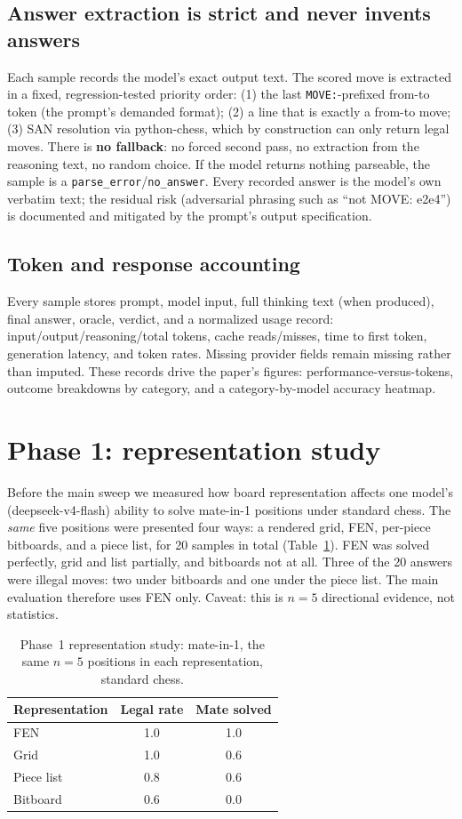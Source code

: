 \documentclass{article}
\begin{document}
\subsection{Answer extraction is strict and never invents answers}
Each sample records the model's exact output text. The scored move is
extracted in a fixed, regression-tested priority order: (1) the last
\texttt{MOVE:}-prefixed from-to token (the prompt's demanded format);
(2) a line that is exactly a from-to move; (3) SAN resolution via
python-chess, which by construction can only return legal moves. There
is \textbf{no fallback}: no forced second pass, no extraction from the
reasoning text, no random choice. If the model returns nothing parseable,
the sample is a \texttt{parse\_error}/\texttt{no\_answer}. Every
recorded answer is the model's own verbatim text; the residual risk
(adversarial phrasing such as ``not MOVE: e2e4'') is documented and
mitigated by the prompt's output specification.

\subsection{Token and response accounting}
Every sample stores prompt, model input, full thinking text (when
produced), final answer, oracle, verdict, and a normalized usage record:
input/output/reasoning/total tokens, cache reads/misses, time to first
token, generation latency, and token rates. Missing provider fields
remain missing rather than imputed. These records drive the paper's
figures: performance-versus-tokens, outcome breakdowns by category, and
a category-by-model accuracy heatmap.

\section{Phase 1: representation study}
\label{sec:phase1}
Before the main sweep we measured how board representation affects one
model's (deepseek-v4-flash) ability to solve mate-in-1 positions under
standard chess. The \emph{same} five positions were presented four ways:
a rendered grid, FEN, per-piece bitboards, and a piece list, for 20
samples in total (Table~\ref{tab:phase1}). FEN was solved perfectly,
grid and list partially, and bitboards not at all. Three of the 20
answers were illegal moves: two under bitboards and one under the piece
list. The main evaluation therefore uses FEN only. Caveat: this is
$n{=}5$ directional evidence, not statistics.

\begin{table}[h]
\centering
\begin{tabular}{lcc}
\hline
Representation & Legal rate & Mate solved \\ \hline
FEN & 1.0 & 1.0 \\
Grid & 1.0 & 0.6 \\
Piece list & 0.8 & 0.6 \\
Bitboard & 0.6 & 0.0 \\ \hline
\end{tabular}
\caption{Phase~1 representation study: mate-in-1, the same $n{=}5$
positions in each representation, standard chess.}
\label{tab:phase1}
\end{table}
\end{document}
